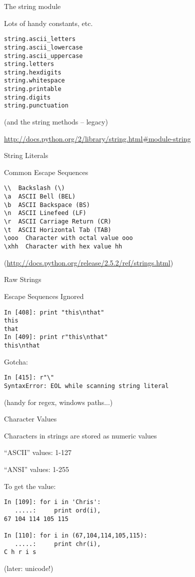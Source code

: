 \documentclass{beamer}
\begin{document}
\begin{frame}[fragile]{The string module}

{\Large Lots of handy constants, etc.}
\begin{verbatim}
string.ascii_letters
string.ascii_lowercase 
string.ascii_uppercase  
string.letters
string.hexdigits 
string.whitespace
string.printable
string.digits
string.punctuation      
\end{verbatim}

\vfill
(and the string methods -- legacy)

\vfill
{\small \url{http://docs.python.org/2/library/string.html#module-string} }
\end{frame} 

\begin{frame}[fragile]{String Literals}

{\Large Common Escape Sequences}
\vfill
\begin{verbatim}
\\  Backslash (\)   
\a  ASCII Bell (BEL)  
\b  ASCII Backspace (BS)  
\n  ASCII Linefeed (LF)   
\r  ASCII Carriage Return (CR)  
\t  ASCII Horizontal Tab (TAB)  
\ooo  Character with octal value ooo 
\xhh  Character with hex value hh
\end{verbatim}
(\url{http://docs.python.org/release/2.5.2/ref/strings.html})
\end{frame} 

\begin{frame}[fragile]{Raw Strings}

{\Large Escape Sequences Ignored}
\vfill
\begin{verbatim}
In [408]: print "this\nthat"
this
that
In [409]: print r"this\nthat"
this\nthat
\end{verbatim}

{\Large Gotcha:}
\begin{verbatim}
In [415]: r"\"
SyntaxError: EOL while scanning string literal
\end{verbatim}

\vfill
(handy for regex, windows paths...)
\end{frame} 


\begin{frame}[fragile]{Character Values}

{\Large Characters in strings are stored as numeric values}

\vfill
{\large ``ASCII'' values: 1-127}

\vfill
{\large ``ANSI'' values: 1-255}


\vfill
{\large To get the value:}
\begin{verbatim}
In [109]: for i in 'Chris':
   .....:     print ord(i), 
67 104 114 105 115

In [110]: for i in (67,104,114,105,115):
   .....:     print chr(i),
C h r i s
\end{verbatim}

\vfill
(later: unicode!)
\end{frame} 
\end{document}
